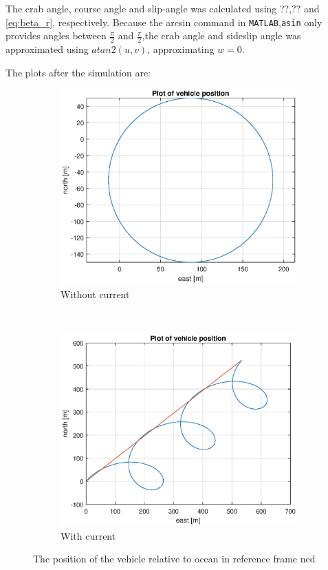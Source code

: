 The crab angle, course angle and slip-angle was calculated using ??,?? and \eqref{eq:beta_r}, respectively. Because the arcsin command in \texttt{MATLAB},\texttt{asin} only provides angles between $\frac{\pi}{2}$ and $\frac{\pi}{2}$,the crab angle and sideslip angle was approximated using $atan2(u,v)$, approximating $w= 0$.

The plots after the simulation are:

\begin{figure}[!ht]
	\centering
	\begin{subfigure}[b]{0.45\textwidth}
		\includegraphics[width=\textwidth]{figures/4_pos.eps}
		\caption{Without current}
	\end{subfigure}
	~ %
	\begin{subfigure}[b]{0.45\textwidth}
		\includegraphics[width=\textwidth]{figures/4_pos_current}
		\caption{With current}
	\end{subfigure}
	\label{fig:4_pos}
	\caption{The position of the vehicle relative to ocean in reference frame ned}
\end{figure}

